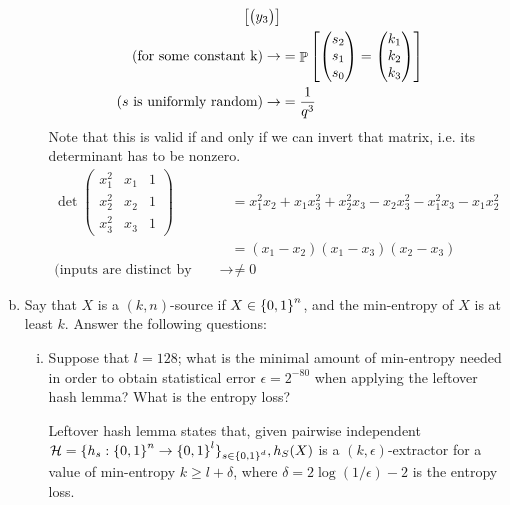 \begin{enumerate}[(a)]
\begin{enumerate}[(i)]
\begin{solution}
\begin{align*}
\begin{bmatrix}
\begin{pmatrix}
							y_3
						\end{pmatrix}
					\end{bmatrix} \\
				\mbox{(for some constant k)} \rightarrow&= \P\begin{bmatrix}
					 	\begin{pmatrix}
							s_2 \\
							s_1 \\
							s_0
						\end{pmatrix}
						=
						\begin{pmatrix}
							k_1 \\
							k_2 \\
							k_3
						\end{pmatrix}
					\end{bmatrix} \\
				\mbox{($s$ is uniformly random)} \rightarrow &= \frac{1}{q^3}
			\end{align*}
			Note that this is valid if and only if we can invert that matrix, i.e. its determinant has to be nonzero.
			\begin{align*}
				\det\begin{pmatrix}
					x_1^2 & x_1 & 1 \\
					x_2^2 & x_2 & 1 \\
					x_3^2 & x_3 & 1
				\end{pmatrix} &=
				x_1^2x_2 + x_1x_3^2 + x_2^2x_3 - x_2x_3^2 -x_1^2x_3 - x_1x_2^2 \\
				&= (x_1 - x_2)(x_1-x_3)(x_2-x_3) \\
				\mbox{(inputs are distinct by hypothesis)} \rightarrow&\ne 0
			\end{align*}
		\end{solution}
	\end{enumerate}

	\item Say that $X$ is a $(k, n)$-source if $X \in \bits^n$, and the min-entropy of $X$ is at least $k$.
	Answer the following questions:
	
	\begin{enumerate}[(i)]
		\item Suppose that $l = 128$; what is the minimal amount of min-entropy needed in order to obtain statistical error $\epsilon = 2^{-80}$ when applying the leftover hash lemma? What is the entropy loss?
		
		\begin{solution}
			Leftover hash lemma states that, given pairwise independent $\mathcal{H} = \{h_s: \bits^n \to \bits^l\}_{s \in \bits^d}, h_S(X)$ is a $(k, \epsilon)$-extractor for a value of min-entropy $k \geq l + \delta$, where $\delta = 2 \log(1/\epsilon) - 2$ is the entropy loss.
			

\end{solution}
\end{enumerate}
\end{enumerate}
